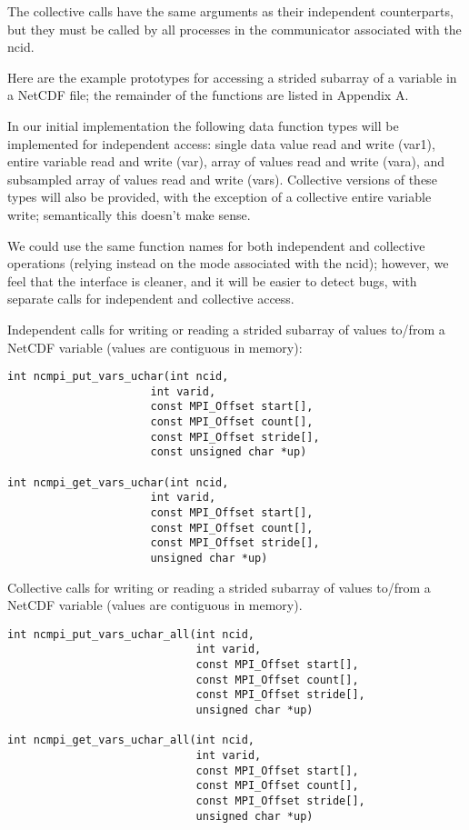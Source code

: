 \documentclass[10pt]{article}
\begin{document}
The collective calls have the same arguments as their independent
counterparts, but they must be called by all processes in the communicator
associated with the ncid.

Here are the example prototypes for accessing a strided subarray of a variable
in a NetCDF file; the remainder of the functions are listed in Appendix A.

In our initial implementation the following data function types will be
implemented for independent access: single data value read and write (var1),
entire variable read and write (var), array of values read and write (vara),
and subsampled array of values read and write (vars).  Collective versions of
these types will also be provided, with the exception of a collective entire
variable write; semantically this doesn't make sense.

We could use the same function names for both independent and collective
operations (relying instead on the mode associated with the ncid); however, we
feel that the interface is cleaner, and it will be easier to detect bugs, with
separate calls for independent and collective access.

%
Independent calls for writing or reading a strided subarray of values to/from
a NetCDF variable (values are contiguous in memory):
\begin{verbatim}
int ncmpi_put_vars_uchar(int ncid, 
                      int varid, 
                      const MPI_Offset start[],
                      const MPI_Offset count[], 
                      const MPI_Offset stride[],
                      const unsigned char *up)

int ncmpi_get_vars_uchar(int ncid, 
                      int varid, 
                      const MPI_Offset start[],
                      const MPI_Offset count[], 
                      const MPI_Offset stride[],
                      unsigned char *up)
\end{verbatim}

Collective calls for writing or reading a strided subarray of values to/from a
NetCDF variable (values are contiguous in memory).
\begin{verbatim}
int ncmpi_put_vars_uchar_all(int ncid, 
                             int varid, 
                             const MPI_Offset start[],
                             const MPI_Offset count[], 
                             const MPI_Offset stride[],
                             unsigned char *up)

int ncmpi_get_vars_uchar_all(int ncid, 
                             int varid, 
                             const MPI_Offset start[],
                             const MPI_Offset count[],
                             const MPI_Offset stride[],
                             unsigned char *up)
\end{verbatim}
\end{document}
